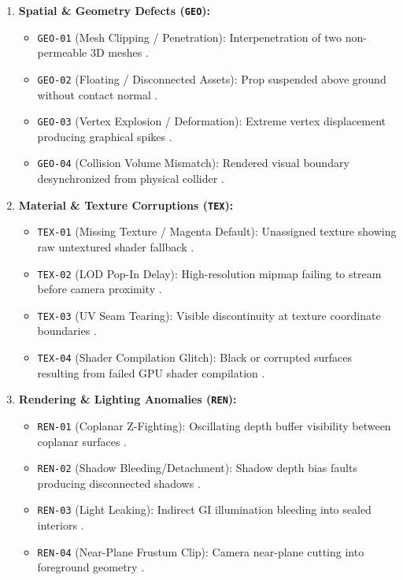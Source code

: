 \documentclass[preprint,12pt,3p]{elsarticle}
\begin{document}
\begin{enumerate}
    \item \textbf{Spatial \& Geometry Defects (\texttt{GEO}):}
    \begin{itemize}
        \item \texttt{GEO-01} (Mesh Clipping / Penetration): Interpenetration of two non-permeable 3D meshes \cite{taesiri2025videogameqa, rahman2023weaksupervision}.
        \item \texttt{GEO-02} (Floating / Disconnected Assets): Prop suspended above ground without contact normal \cite{kovacs2026stateaware}.
        \item \texttt{GEO-03} (Vertex Explosion / Deformation): Extreme vertex displacement producing graphical spikes \cite{yi2025hybrid}.
        \item \texttt{GEO-04} (Collision Volume Mismatch): Rendered visual boundary desynchronized from physical collider \cite{biemer2021grammar}.
    \end{itemize}

    \item \textbf{Material \& Texture Corruptions (\texttt{TEX}):}
    \begin{itemize}
        \item \texttt{TEX-01} (Missing Texture / Magenta Default): Unassigned texture showing raw untextured shader fallback \cite{taesiri2025videogameqa, ling2020usingdeepcnn}.
        \item \texttt{TEX-02} (LOD Pop-In Delay): High-resolution mipmap failing to stream before camera proximity \cite{muller2026tempglitch}.
        \item \texttt{TEX-03} (UV Seam Tearing): Visible discontinuity at texture coordinate boundaries \cite{davarmanesh2020automated}.
        \item \texttt{TEX-04} (Shader Compilation Glitch): Black or corrupted surfaces resulting from failed GPU shader compilation \cite{chen2023shaderbug}.
    \end{itemize}

    \item \textbf{Rendering \& Lighting Anomalies (\texttt{REN}):}
    \begin{itemize}
        \item \texttt{REN-01} (Coplanar Z-Fighting): Oscillating depth buffer visibility between coplanar surfaces \cite{muller2026tempglitch, rifaat2026multilabel}.
        \item \texttt{REN-02} (Shadow Bleeding/Detachment): Shadow depth bias faults producing disconnected shadows \cite{lu2026howfarvlms}.
        \item \texttt{REN-03} (Light Leaking): Indirect GI illumination bleeding into sealed interiors \cite{kovacs2026stateaware}.
        \item \texttt{REN-04} (Near-Plane Frustum Clip): Camera near-plane cutting into foreground geometry \cite{taesiri2025videogameqa, yu2026refglitch}.
    \end{itemize}


\end{enumerate}
\end{document}
